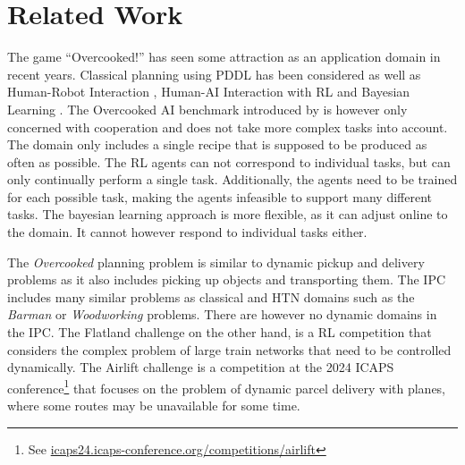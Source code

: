 \section{Related Work}
\label{sec:related-work}

The game ``Overcooked!'' has seen some attraction as an application domain in recent years.
Classical planning using \ac{PDDL} has been considered \citep{yuxinliuPlanningOvercookedGame2020} as well as Human-Robot Interaction \citep{bishopCHAOPTTestbedEvaluating2020,roseroTwoManyCooks2021}, Human-\ac{AI} Interaction with \ac{RL} \citep{carrollUtilityLearningHumans2019,charakornInvestigatingPartnerDiversification2020,knottEvaluatingRobustnessCollaborative2021,nalepkaInteractionFlexibilityArtificial2021,fontaineImportanceEnvironmentsHumanRobot2021,zhaoMaximumEntropyPopulationbased2023,sarkarPantheonrlMarlLibrary2022,ruhdorferMindsChefsUsing2023} and Bayesian Learning \citep{ribeiroAssistingUnknownTeammates2022}.
The Overcooked \ac{AI} benchmark introduced by \cite{carrollUtilityLearningHumans2019} is however only concerned with cooperation and does not take more complex tasks into account.
The domain only includes a single recipe that is supposed to be produced as often as possible.
The \ac{RL} agents can not correspond to individual tasks, but can only continually perform a single task.
Additionally, the agents need to be trained for each possible task, making the agents infeasible to support many different tasks.
The bayesian learning approach is more flexible, as it can adjust online to the domain. 
It cannot however respond to individual tasks either.

The \textit{Overcooked} planning problem is similar to dynamic pickup and delivery problems \citep{berbegliaDynamicPickupDelivery2010} as it also includes picking up objects and transporting them.
The \ac{IPC} \citep{taitler2023InternationalPlanning2024} includes many similar problems as classical and \ac{HTN} domains such as the \textit{Barman} or \textit{Woodworking} problems.
There are however no dynamic domains in the \ac{IPC}.
The Flatland challenge \cite{mohantyFlatlandRLMultiAgentReinforcement2020} on the other hand, is a \ac{RL} competition that considers the complex problem of large train networks that need to be controlled dynamically.
The Airlift challenge \citep{bertsimasAirliftPlanningProblem2019} is a competition at the 2024 ICAPS conference\footnote{See \href{https://icaps24.icaps-conference.org/competitions/airlift/}{icaps24.icaps-conference.org/competitions/airlift}} that focuses on the problem of dynamic parcel delivery with planes, where some routes may be unavailable for some time.

